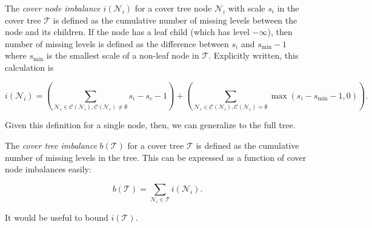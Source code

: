 \begin{defn}
The {\it cover node imbalance} $i(\mathscr{N}_i)$ for a cover tree node
$\mathscr{N}_i$ with scale $s_i$ in the cover tree $\mathscr{T}$ is defined as
the cumulative number of missing levels between the node and its children.  If
the node has a leaf child (which has level $-\infty$), then number of missing
levels is defined as the difference between $s_i$ and $s_{\min} - 1$ where
$s_{\min}$ is the smallest scale of a non-leaf node in $\mathscr{T}$.
Explicitly written, this calculation is

\begin{equation}
i(\mathscr{N}_i) = \left( \sum_{\mathscr{N}_c \in \mathscr{C}(\mathscr{N}_i),
\mathscr{C}(\mathscr{N}_c) \ne \emptyset} s_i - s_c - 1 \right) + \left(
\sum_{\mathscr{N}_c \in \mathscr{C}(\mathscr{N}_i), \mathscr{C}(\mathscr{N}_c) =
\emptyset} \max(s_i - s_{\min} - 1, 0) \right).
\end{equation}
\end{defn}

Given this definition for a single node, then, we can generalize to the full
tree.

\begin{defn}
The {\it cover tree imbalance} $b(\mathscr{T})$ for a cover tree $\mathscr{T}$
is defined as the cumulative number of missing levels in the tree.  This can be
expressed as a function of cover node imbalances easily:

\begin{equation}
b(\mathscr{T}) = \sum_{\mathscr{N}_i \in \mathscr{T}} i(\mathscr{N}_i).
\end{equation}
\end{defn}

It would be useful to bound $i(\mathscr{T})$.

